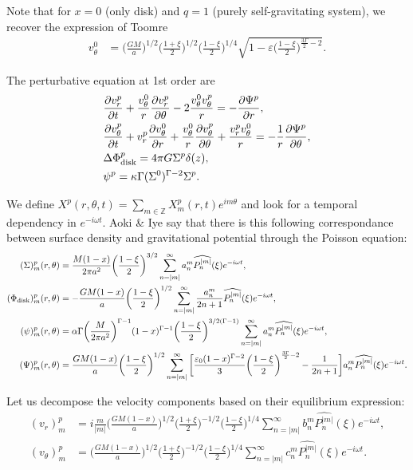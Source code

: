 \documentclass[11pt]{article}
\newcommand{\vr}{v_{r}}
\newcommand{\vt}{v_{\theta}}
\newcommand{\Phid}{\Phi_{\rm{disk}}}
\newcommand{\anm}{a_n^m}
\newcommand{\bnm}{b_n^m}
\newcommand{\cnm}{c_n^m}
\newcommand{\Pnm}{P_n^{|m|}}
\newcommand{\hPnm}{\widehat{\Pnm}}
\begin{document}
Note that for $x=0$ (only disk) and $q=1$ (purely self-gravitating system), we recover the expression of Toomre
\begin{align}
\vt^0 &=\bigg(\frac{GM}{a} \bigg)^{1/2}\bigg(\frac{1+\xi}{2}\bigg)^{1/2} \bigg(\frac{1-\xi}{2}\bigg)^{1/4}  \sqrt{1- \varepsilon \bigg(\frac{1-\xi}{2}\bigg)^{\frac{3\Gamma}{2}-2}} .
\end{align}

The perturbative equation at 1st order are
\begin{align}
&\frac{\partial \vr^p}{\partial t} + \frac{\vt^0}{r} \frac{\partial \vr^p}{\partial \theta} - 2\frac{\vt^0 \vt^p}{r} = -\frac{\partial \Psi^p}{\partial r} ,\\
&\frac{\partial \vt^p}{\partial t} + \vr^p \frac{\partial \vt^0}{\partial r} + \frac{\vt^0}{r} \frac{\partial \vt^p}{\partial \theta} + \frac{\vr^p\vt^0}{r} = -\frac{1}{r}\frac{\partial \Psi^p}{\partial \theta} ,\\
& \Delta \Phid^p = 4\pi G  \Sigma^p \delta (z), \\
& \psi^p =  \kappa \Gamma  (\Sigma^0)^{\Gamma-2} \Sigma^p .
\end{align}

We define $X^p(r,\theta,t) = \sum_{m\in \mathbb{Z}} X_m^p(r,t) e^{i m \theta}$ and look for a temporal dependency in $e^{-i \omega t}$.
Aoki \& Iye say that there is this following correspondance between surface density and gravitational potential through the Poisson equation:
\begin{align}
(\Sigma)_m^p (r,\theta) &= \frac{M(1-x)}{2\pi a^2} \bigg(\frac{1-\xi}{2}\bigg)^{3/2} \sum_{n=|m|}^{\infty} \anm \hPnm(\xi) e^{-i \omega t} ,\\
(\Phid)_m^p (r,\theta) &= -\frac{GM(1-x)}{a} \bigg(\frac{1-\xi}{2}\bigg)^{1/2} \sum_{n=|m|}^{\infty} \frac{\anm}{2n+1} \hPnm(\xi) e^{-i \omega t} ,\\
(\psi)_m^p (r,\theta) &= \alpha \Gamma \bigg(\frac{M}{2\pi a^2} \bigg)^{\Gamma-1} (1-x)^{\Gamma-1} \bigg(\frac{1-\xi}{2}\bigg)^{3/2(\Gamma-1)} \sum_{n=|m|}^{\infty} \anm \hPnm(\xi) e^{-i \omega t} ,\\
(\Psi)_m^p (r,\theta) &= \frac{GM(1-x)}{a } \bigg(\frac{1-\xi}{2}\bigg)^{1/2}\sum_{n=|m|}^{\infty} \bigg[\frac{\varepsilon_0(1-x)^{\Gamma-2} }{3} \bigg(\frac{1-\xi}{2}\bigg)^{\frac{3\Gamma}{2}-2}  -\frac{1}{2n+1}  \bigg]\anm \hPnm(\xi)e^{-i \omega t} .
\end{align}

Let us decompose the velocity components based on their equilibrium expression:
\begin{align}
(\vr)_m^p &= i \frac{m}{|m|} \bigg(\frac{GM(1-x)}{a}\bigg)^{1/2} \bigg(\frac{1+\xi}{2}\bigg)^{-1/2} \bigg(\frac{1-\xi}{2}\bigg)^{1/4} \sum_{n=|m|}^{\infty} \bnm \hPnm(\xi) e^{-i \omega t} ,\\
(\vt)_m^p &=\bigg(\frac{GM(1-x)}{a}\bigg)^{1/2} \bigg(\frac{1+\xi}{2}\bigg)^{-1/2} \bigg(\frac{1-\xi}{2}\bigg)^{1/4} \sum_{n=|m|}^{\infty} \cnm \hPnm(\xi) e^{-i \omega t} .
\end{align}
\end{document}
